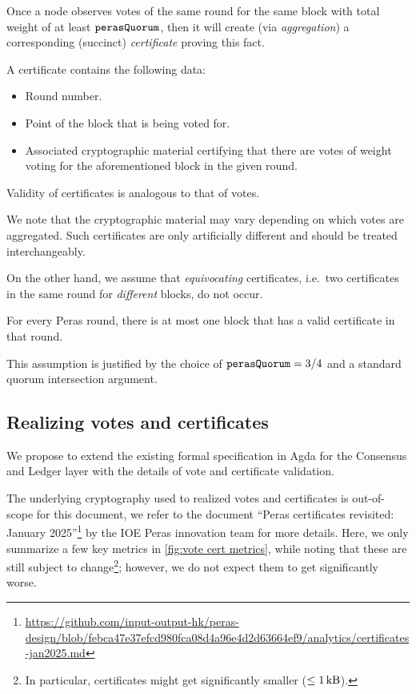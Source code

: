 Once a node observes votes of the same round for the same block with total weight of at least $\mathtt{perasQuorum}$, then it will create (via \emph{aggregation}) a corresponding (succinct) \emph{certificate} proving this fact.

A certificate contains the following data:
\begin{itemize}
\item Round number.
\item Point of the block that is being voted for.
\item Associated cryptographic material certifying that there are votes of weight \perasQuorum{} voting for the aforementioned block in the given round.
\end{itemize}

Validity of certificates is analogous to that of votes.

We note that the cryptographic material may vary depending on which votes are aggregated.
Such certificates are only artificially different and should be treated interchangeably.

On the other hand, we assume that \emph{equivocating} certificates, i.e.\ two certificates in the same round for \emph{different} blocks, do not occur.
\begin{tcolorbox}[title=Assumption]
  For every Peras round, there is at most one block that has a valid certificate in that round.
\end{tcolorbox}
This assumption is justified by the choice of $\mathtt{perasQuorum} = 3/4$ and a standard quorum intersection argument.

\subsection{Realizing votes and certificates}

We propose to extend the existing formal specification in Agda for the Consensus and Ledger layer \parencite{consensus-spec,cardano-formal-ledger-specs} with the details of vote and certificate validation.

The underlying cryptography used to realized votes and certificates is out-of-scope for this document, we refer to the document \enquote{Peras certificates revisited: January 2025}\footnote{\url{https://github.com/input-output-hk/peras-design/blob/febca47e37efcd980fca08d4a96e4d2d63664ef9/analytics/certificates-jan2025.md}} by the IOE Peras innovation team for more details.
Here, we only summarize a few key metrics in \cref{fig:vote cert metrics}, while noting that these are still subject to change\footnote{In particular, certificates might get significantly smaller ($\le \qty{1}{\kilo\byte}$).}; however, we do not expect them to get significantly worse.

